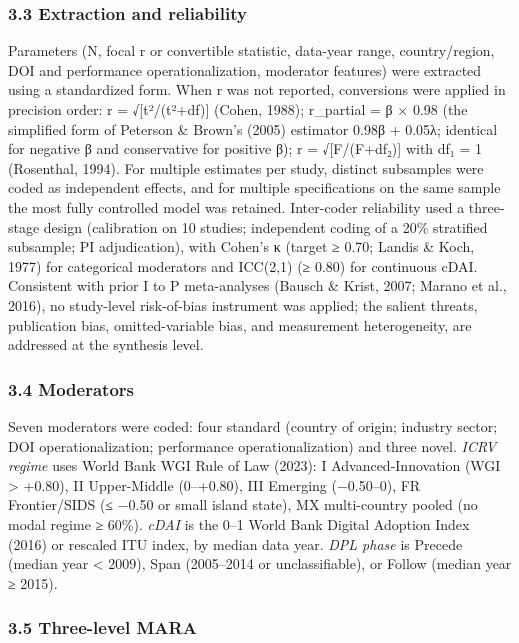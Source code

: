 \documentclass[
  12pt,a4paper]{article}
\begin{document}
\hypertarget{extraction-and-reliability}{%
\subsubsection{3.3 Extraction and
reliability}\label{extraction-and-reliability}}

Parameters (N, focal r or convertible statistic, data-year range,
country/region, DOI and performance operationalization, moderator
features) were extracted using a standardized form. When r was not
reported, conversions were applied in precision order: r =
√{[}t²/(t²+df){]} (Cohen, 1988); r\_partial = β × 0.98 (the simplified
form of Peterson \& Brown's (2005) estimator 0.98β + 0.05λ; identical
for negative β and conservative for positive β); r = √{[}F/(F+df₂){]}
with df₁ = 1 (Rosenthal, 1994). For multiple estimates per study,
distinct subsamples were coded as independent effects, and for multiple
specifications on the same sample the most fully controlled model was
retained. Inter-coder reliability used a three-stage design (calibration
on 10 studies; independent coding of a 20\% stratified subsample; PI
adjudication), with Cohen's κ (target ≥ 0.70; Landis \& Koch, 1977) for
categorical moderators and ICC(2,1) (≥ 0.80) for continuous cDAI.
Consistent with prior I to P meta-analyses (Bausch \& Krist, 2007;
Marano et al., 2016), no study-level risk-of-bias instrument was
applied; the salient threats, publication bias, omitted-variable bias,
and measurement heterogeneity, are addressed at the synthesis level.

\hypertarget{moderators}{%
\subsubsection{3.4 Moderators}\label{moderators}}

Seven moderators were coded: four standard (country of origin; industry
sector; DOI operationalization; performance operationalization) and
three novel. \emph{ICRV regime} uses World Bank WGI Rule of Law (2023):
I Advanced-Innovation (WGI \textgreater{} +0.80), II Upper-Middle
(0--+0.80), III Emerging (−0.50--0), FR Frontier/SIDS (≤ −0.50 or small
island state), MX multi-country pooled (no modal regime ≥ 60\%).
\emph{cDAI} is the 0--1 World Bank Digital Adoption Index (2016) or
rescaled ITU index, by median data year. \emph{DPL phase} is Precede
(median year \textless{} 2009), Span (2005--2014 or unclassifiable), or
Follow (median year ≥ 2015).

\hypertarget{three-level-mara}{%
\subsubsection{3.5 Three-level MARA}\label{three-level-mara}}
\end{document}
